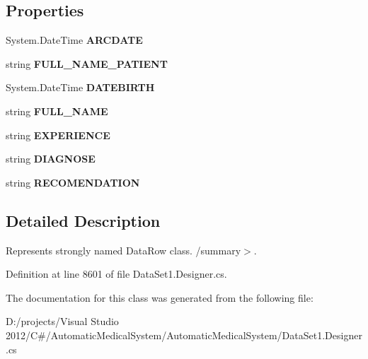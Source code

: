 \subsection*{Properties}
\begin{CompactItemize}
\item 
System.DateTime \textbf{ARCDATE}\hspace{0.3cm}{\tt  [get, set]}\label{class_automatic_medical_system_1_1_data_set1_1_1_r_e_p_o_r_t_s_p_d_o_c_t_o_r_s_row_6ad771bf2a1434242701928ee792a5e2}

\item 
string \textbf{FULL\_\-NAME\_\-PATIENT}\hspace{0.3cm}{\tt  [get, set]}\label{class_automatic_medical_system_1_1_data_set1_1_1_r_e_p_o_r_t_s_p_d_o_c_t_o_r_s_row_6340c446157c253c573810507ed15786}

\item 
System.DateTime \textbf{DATEBIRTH}\hspace{0.3cm}{\tt  [get, set]}\label{class_automatic_medical_system_1_1_data_set1_1_1_r_e_p_o_r_t_s_p_d_o_c_t_o_r_s_row_895edebdc3e39fd9fcce90a6cdab078a}

\item 
string \textbf{FULL\_\-NAME}\hspace{0.3cm}{\tt  [get, set]}\label{class_automatic_medical_system_1_1_data_set1_1_1_r_e_p_o_r_t_s_p_d_o_c_t_o_r_s_row_f997ba0a18e4cefe90ed260a3fcde36f}

\item 
string \textbf{EXPERIENCE}\hspace{0.3cm}{\tt  [get, set]}\label{class_automatic_medical_system_1_1_data_set1_1_1_r_e_p_o_r_t_s_p_d_o_c_t_o_r_s_row_00a72ffe0ec486756992c61e881bbf04}

\item 
string \textbf{DIAGNOSE}\hspace{0.3cm}{\tt  [get, set]}\label{class_automatic_medical_system_1_1_data_set1_1_1_r_e_p_o_r_t_s_p_d_o_c_t_o_r_s_row_7eda1695d80db5eb1149a8f0fb410333}

\item 
string \textbf{RECOMENDATION}\hspace{0.3cm}{\tt  [get, set]}\label{class_automatic_medical_system_1_1_data_set1_1_1_r_e_p_o_r_t_s_p_d_o_c_t_o_r_s_row_b0e0d359171f577c4f03f09bec8e0d61}

\end{CompactItemize}


\subsection{Detailed Description}
Represents strongly named DataRow class. /summary$>$. 

Definition at line 8601 of file DataSet1.Designer.cs.

The documentation for this class was generated from the following file:\begin{CompactItemize}
\item 
D:/projects/Visual Studio 2012/C\#/AutomaticMedicalSystem/AutomaticMedicalSystem/DataSet1.Designer.cs\end{CompactItemize}
